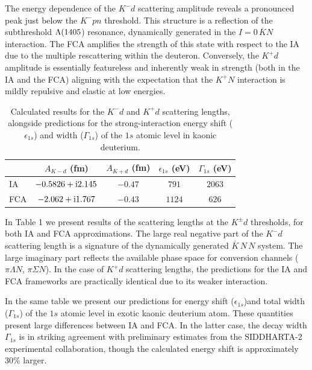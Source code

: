 \documentclass[12pt,a4paper]{article}
\begin{document}
The energy dependence of the $K^-{d}$ scattering amplitude reveals a pronounced peak just below the $K^-{pn}$ threshold. This structure is a reflection of the subthreshold $\rm \Lambda (1405$) resonance, dynamically generated in the $I = 0 \, \overline{K} N$ interaction. The FCA amplifies the strength of this state with respect to the IA due to the multiple rescattering within the deuteron. Conversely, the $K^+{d}$ amplitude is essentially featureless and inherently weak in strength (both in the IA and the FCA) aligning with the expectation that the $K^+{N}$ interaction is mildly repulsive and elastic at low energies.


\begin{table}[t]
\centering

\begin{tabular}{lcccc}
\toprule
& $A_{K-d}$ (fm) & $A_{K+d}$ (fm) & $\epsilon_{1s}$ (eV) & $\Gamma_{1s}$ (eV) \\
\midrule
IA & $-0.5826 + \rm{i}2.145$ & $-0.47$ & $791$ & $2063$ \\
FCA & $-2.062 + \rm{i}1.767$ & $-0.43$ & $1124$ & $626$ \\

\bottomrule

\end{tabular}
\caption{Calculated results for the $K^-d$ and $K^+d$ scattering lengths, alongside predictions for the strong-interaction energy shift ($\epsilon_{1s}$) and width ($\Gamma_{1s}$) of the $1s$ atomic level in kaonic deuterium.}
\label{tab:kd-results}
\end{table}

In Table 1 we present results of the scattering lengths at the $K^\pm {d}$ thresholds, for both IA and FCA approximations. The large real negative part of the $K^-{d}$ scattering length is a signature of the dynamically generated $\bar{K}\, N \, N$ system. The large imaginary part reflects the available phase space for conversion channels ($\pi \Lambda N$, $\pi \Sigma N$). In the case of $K^+{d}$ scattering lengths, the predictions for the IA and FCA frameworks are practically identical due to its weaker interaction. 

In the same table we present our predictions for energy shift ($\epsilon_{1s}$)and total width ($\Gamma_{1s}$) of the $1s$ atomic level in exotic kaonic deuterium atom. These quantities present large differences between IA and FCA. In the latter case, the decay width $\Gamma_{1s}$ is in striking agreement with preliminary estimates from the SIDDHARTA-2 experimental collaboration, though the calculated energy shift is approximately 30\% larger.
\end{document}
